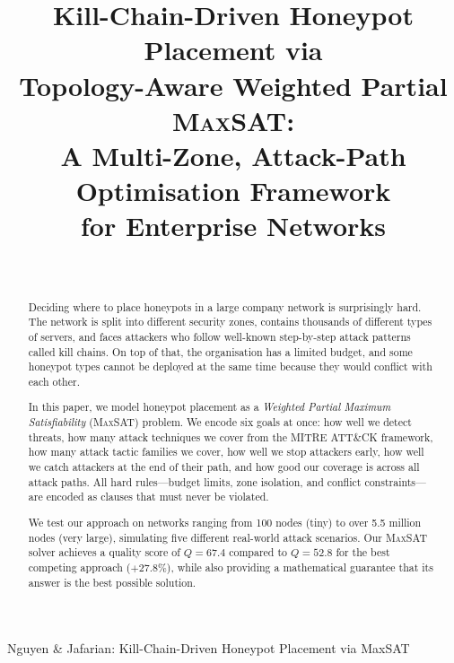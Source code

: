 \documentclass[journal]{IEEEtran}
\newcommand{\maxsat}{\textsc{MaxSAT}}
\begin{document}
\title{Kill-Chain-Driven Honeypot Placement via\\
       Topology-Aware Weighted Partial \textsc{MaxSAT}:\\
       A Multi-Zone, Attack-Path Optimisation Framework\\
       for Enterprise Networks}

\author{
  \\
}

%
{Nguyen \& Jafarian: Kill-Chain-Driven Honeypot Placement via MaxSAT}

\maketitle

\begin{abstract}
Deciding where to place honeypots in a large company network is
surprisingly hard. The network is split into different security
zones, contains thousands of different types of servers, and faces
attackers who follow well-known step-by-step attack patterns called
kill chains. On top of that, the organisation has a limited budget,
and some honeypot types cannot be deployed at the same time because
they would conflict with each other.

In this paper, we model honeypot placement as a \emph{Weighted
Partial Maximum Satisfiability} (\maxsat{}) problem. We encode six
goals at once: how well we detect threats, how many attack techniques
we cover from the MITRE ATT\&CK framework, how many attack tactic
families we cover, how well we stop attackers early, how well we
catch attackers at the end of their path, and how good our coverage
is across all attack paths. All hard rules---budget limits, zone
isolation, and conflict constraints---are encoded as clauses that
must never be violated.

We test our approach on networks ranging from 100 nodes (tiny) to
over 5.5 million nodes (very large), simulating five different
real-world attack scenarios. Our \maxsat{} solver achieves a
quality score of $Q = 67.4$ compared to $Q = 52.8$ for the best
competing approach ($+27.8\%$), while also providing a
mathematical guarantee that its answer is the best possible
solution.
\end{abstract}
\end{document}
